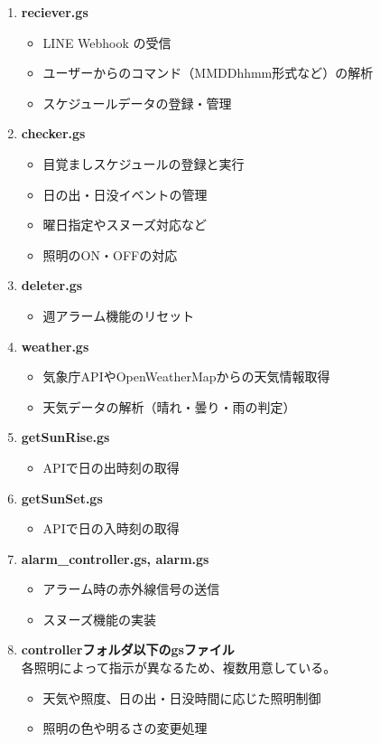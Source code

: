 \documentclass{jarticle}
\begin{document}
\begin{enumerate}
  \item \textbf{reciever.gs}
  \begin{itemize}
    \item LINE Webhook の受信
    \item ユーザーからのコマンド（MMDDhhmm形式など）の解析
    \item スケジュールデータの登録・管理
  \end{itemize}

  \item \textbf{checker.gs}
  \begin{itemize}
    \item 目覚ましスケジュールの登録と実行
    \item 日の出・日没イベントの管理
    \item 曜日指定やスヌーズ対応など
    \item 照明のON・OFFの対応
  \end{itemize}

  \item \textbf{deleter.gs}
  \begin{itemize}
    \item 週アラーム機能のリセット
  \end{itemize}

  \item \textbf{weather.gs}
  \begin{itemize}
    \item 気象庁APIやOpenWeatherMapからの天気情報取得
    \item 天気データの解析（晴れ・曇り・雨の判定）
  \end{itemize}

  \item \textbf{getSunRise.gs}
  \begin{itemize}
    \item APIで日の出時刻の取得
  \end{itemize}

  \item \textbf{getSunSet.gs}
  \begin{itemize}
    \item APIで日の入時刻の取得
  \end{itemize}

  \item \textbf{alarm\_controller.gs, alarm.gs}
  \begin{itemize}
    \item アラーム時の赤外線信号の送信
    \item スヌーズ機能の実装
  \end{itemize}

  \item \textbf{controllerフォルダ以下のgsファイル}\\
  各照明によって指示が異なるため、複数用意している。
  \begin{itemize}
    \item 天気や照度、日の出・日没時間に応じた照明制御
    \item 照明の色や明るさの変更処理
  \end{itemize}
\end{enumerate}
\end{document}
